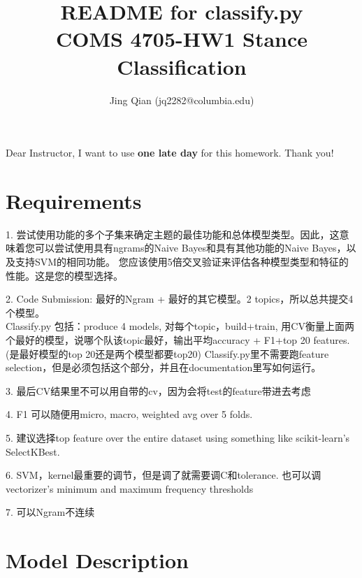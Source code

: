 \documentclass{article}
\title{README for classify.py\\COMS 4705-HW1 Stance Classification}
\author{Jing Qian (jq2282@columbia.edu)}
\begin{document}
\maketitle

Dear Instructor, I want to use \textbf{one late day} for this homework. Thank you!

\section*{Requirements}
1. 尝试使用功能的多个子集来确定主题的最佳功能和总体模型类型。因此，这意味着您可以尝试使用具有ngrams的Naive Bayes和具有其他功能的Naive Bayes，以及支持SVM的相同功能。 
您应该使用5倍交叉验证来评估各种模型类型和特征的性能。这是您的模型选择。 

2. Code Submission: 最好的Ngram + 最好的其它模型。2 topics，所以总共提交4个模型。\\
Classify.py 包括：produce 4 models, 对每个topic，build+train, 用CV衡量上面两个最好的模型，说哪个队该topic最好，输出平均accuracy + F1+top 20 features. (是最好模型的top 20还是两个模型都要top20)
Classify.py里不需要跑feature selection，但是必须包括这个部分，并且在documentation里写如何运行。

3. 最后CV结果里不可以用自带的cv，因为会将test的feature带进去考虑

4. F1 可以随便用micro, macro, weighted avg over 5 folds.

5. 建议选择top feature  over the entire dataset using something like scikit-learn's SelectKBest.

6. SVM，kernel最重要的调节，但是调了就需要调C和tolerance. 也可以调vectorizer's minimum and maximum frequency thresholds

7. 可以Ngram不连续

\section*{Model Description}
\end{document}
